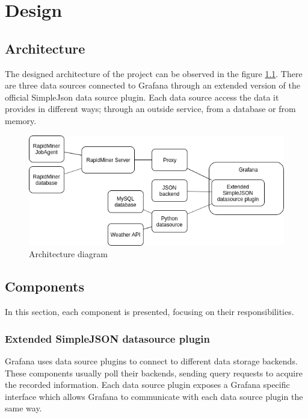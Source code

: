 \chapter{Design}

\section{Architecture}

The designed architecture of the project can be observed in the figure \ref{fig:arch}. There are three data sources connected to Grafana through an extended version of the official SimpleJson data source plugin. Each data source access the data it provides in different ways; through an outside service, from a database or from memory.

\begin{figure}[h]
	\centering
	\includegraphics[width=150mm, keepaspectratio]{figures/architecture.png}
	\caption{Architecture diagram}
	\label{fig:arch}
\end{figure}

\section{Components}

In this section, each component is presented, focusing on their responsibilities.

\subsection{Extended SimpleJSON datasource plugin}

Grafana uses data source plugins to connect to different data storage backends. These components usually poll their backends, sending query requests to acquire the recorded information. Each data source plugin exposes a Grafana specific interface which allows Grafana to communicate with each data source plugin the same way.

